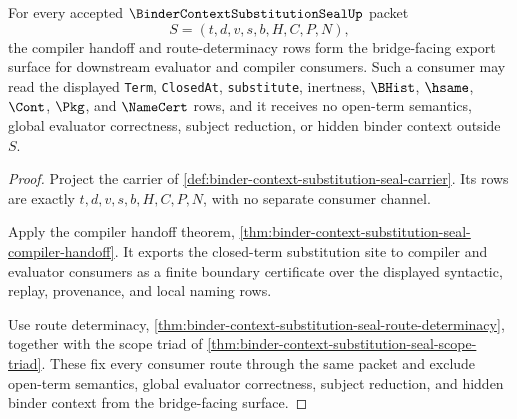 \begin{theorem}
\label{thm:binder-context-substitution-seal-bridged-export}
For every accepted $\BinderContextSubstitutionSealUp$ packet
$$
S=(t,d,v,s,b,H,C,P,N),
$$
the compiler handoff and route-determinacy rows form the bridge-facing export surface for downstream evaluator and compiler consumers. Such a consumer may read the displayed \texttt{Term}, \texttt{ClosedAt}, \texttt{substitute}, inertness, $\BHist$, $\hsame$, $\Cont$, $\Pkg$, and $\NameCert$ rows, and it receives no open-term semantics, global evaluator correctness, subject reduction, or hidden binder context outside $S$.
\end{theorem}
\begin{proof}
Project the carrier of \autoref{def:binder-context-substitution-seal-carrier}. Its rows are exactly $t,d,v,s,b,H,C,P,N$, with no separate consumer channel.

Apply the compiler handoff theorem, \autoref{thm:binder-context-substitution-seal-compiler-handoff}. It exports the closed-term substitution site to compiler and evaluator consumers as a finite boundary certificate over the displayed syntactic, replay, provenance, and local naming rows.

Use route determinacy, \autoref{thm:binder-context-substitution-seal-route-determinacy}, together with the scope triad of \autoref{thm:binder-context-substitution-seal-scope-triad}. These fix every consumer route through the same packet and exclude open-term semantics, global evaluator correctness, subject reduction, and hidden binder context from the bridge-facing surface.
\end{proof}


